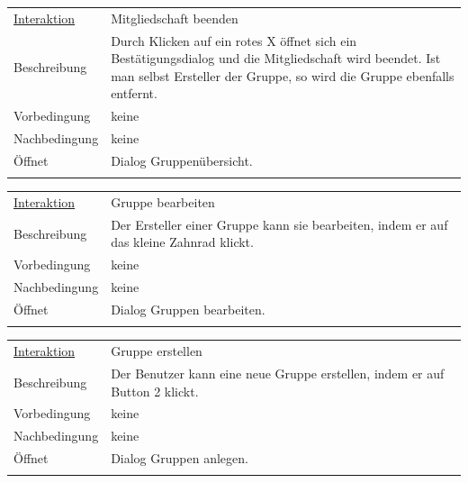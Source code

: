 \documentclass[12pt,a4paper]{article}
\begin{document}
{\begin{tabular}{l p{12cm}}
	\underline{Interaktion} 	 & Mitgliedschaft beenden\\ 
	Beschreibung   	& Durch Klicken auf ein rotes X öffnet sich ein Bestätigungsdialog und die Mitgliedschaft wird beendet. Ist man selbst Ersteller der Gruppe, so wird die Gruppe ebenfalls entfernt.\\
	Vorbedingung	& keine \\
	Nachbedingung	& keine \\
	Öffnet			& Dialog \glqq Gruppenübersicht\grqq.\\\\
\end{tabular}

\begin{tabular}{l p{12cm}}
	\underline{Interaktion} 	 & Gruppe bearbeiten\\ 
	Beschreibung   	& Der Ersteller einer Gruppe kann sie bearbeiten, indem er auf das kleine Zahnrad klickt.\\
	Vorbedingung	& keine \\
	Nachbedingung	& keine \\
	Öffnet			& Dialog \glqq Gruppen bearbeiten\grqq.\\\\
\end{tabular}

\begin{tabular}{l p{12cm}}
	\underline{Interaktion} 	 & Gruppe erstellen\\ 
	Beschreibung   	& Der Benutzer kann eine neue Gruppe erstellen, indem er auf Button 2 klickt.\\
	Vorbedingung	& keine \\
	Nachbedingung	& keine \\
	Öffnet			& Dialog \glqq Gruppen anlegen\grqq.\\\\
\end{tabular}

\begin{figure}[H]
	\centering

\end{figure}}
\end{document}
